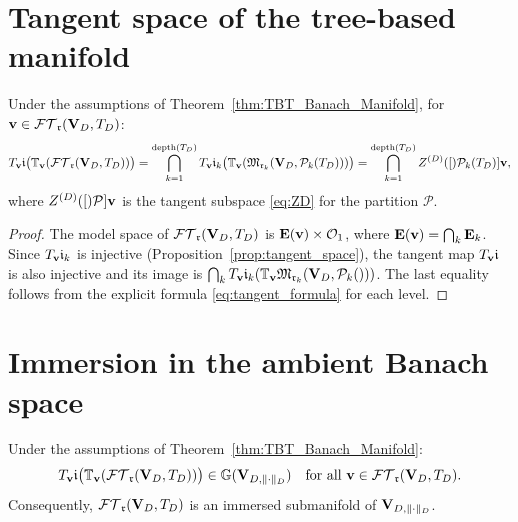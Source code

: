\section{Tangent space of the tree-based manifold}
\label{sec:TB_manifold:tangent}

\begin{proposition}
\label{prop:TBT_tangent}
Under the assumptions of Theorem~\ref{thm:TBT_Banach_Manifold},
for $\mathbf{v} \in \mathcal{FT}_{\mathfrak{r}}(\mathbf{V}_D,T_D)$:
\begin{equation}
\label{eq:TBT_tangent}
    T_{\mathbf{v}} \mathfrak{i}\bigl(\mathbb{T}_{\mathbf{v}}(\mathcal{FT}_{\mathfrak{r}}(\mathbf{V}_D,T_D))\bigr)
    = \bigcap_{k=1}^{\mathrm{depth}(T_D)}
    T_{\mathbf{v}} \mathfrak{i}_k
    \bigl(\mathbb{T}_{\mathbf{v}}(\mathfrak{M}_{\mathfrak{r}_k}(\mathbf{V}_D, \mathcal{P}_{k}(T_D)))\bigr)
    = \bigcap_{k=1}^{\mathrm{depth}(T_D)} Z^{(D)}([)\mathcal{P}_{k}(T_D)]{\mathbf{v}},
\end{equation}
where $Z^{(D)}([)\mathcal{P}]{\mathbf{v}}$ is the tangent subspace
\eqref{eq:ZD} for the partition $\mathcal{P}$.
\end{proposition}

\begin{proof}
The model space of $\mathcal{FT}_{\mathfrak{r}}(\mathbf{V}_D,T_D)$ is $\mathbf{E}(\mathbf{v}) \times \mathcal{O}_1$,
where $\mathbf{E}(\mathbf{v}) = \bigcap_k \mathbf{E}_{k}$. Since $T_{\mathbf{v}} \mathfrak{i}_k$
is injective (Proposition~\ref{prop:tangent_space}), the tangent map
$T_{\mathbf{v}} \mathfrak{i}$ is also injective and its image is
$\bigcap_k T_{\mathbf{v}} \mathfrak{i}_k(\mathbb{T}_{\mathbf{v}} \mathfrak{M}_{\mathfrak{r}_k}(\mathbf{V}_D, \mathcal{P}_{k}()))$.
The last equality follows from the explicit formula
\eqref{eq:tangent_formula} for each level.
\end{proof}

\section{Immersion in the ambient Banach space}
\label{sec:TB_manifold:immersion}

\begin{theorem}
\label{thm:TBT_immersion}
Under the assumptions of Theorem~\ref{thm:TBT_Banach_Manifold}:
\begin{equation}
\label{eq:TBT_tangent_split}
    T_{\mathbf{v}} \mathfrak{i}\bigl(\mathbb{T}_{\mathbf{v}}(\mathcal{FT}_{\mathfrak{r}}(\mathbf{V}_D,T_D))\bigr)
    \in \mathbb{G}(\mathbf{V}_{D,\|\cdot\|_D})
    \quad \text{for all } \mathbf{v} \in \mathcal{FT}_{\mathfrak{r}}(\mathbf{V}_D,T_D).
\end{equation}
Consequently, $\mathcal{FT}_{\mathfrak{r}}(\mathbf{V}_D,T_D)$ is an immersed submanifold of $\mathbf{V}_{D,\|\cdot\|_D}$.
\end{theorem}

